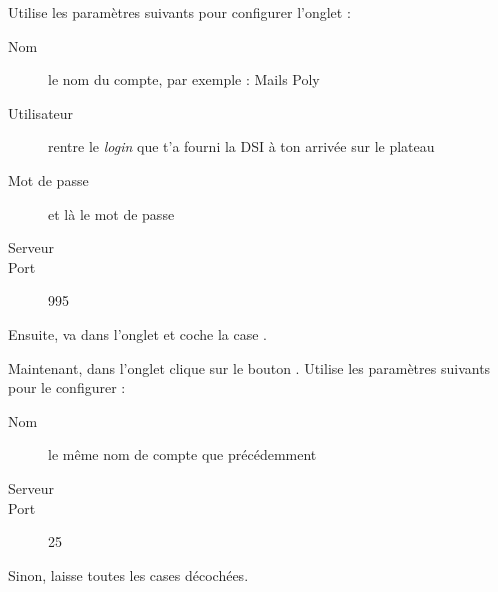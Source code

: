 Utilise les param\`etres suivants pour configurer l'onglet  :
\begin{description}
  \item[Nom] le nom du compte, par exemple : Mails Poly
  \item[Utilisateur] rentre le \emph{login}  que t'a fourni la DSI \`a  ton arriv\'ee sur le plateau
  \item[Mot de passe] et l\`a  le mot de passe 
  \item[Serveur] 
  \item[Port] 995
\end{description}
Ensuite, va dans l'onglet  et coche la case
.

Maintenant, dans l'onglet  clique sur le
bouton . Utilise les param\`etres suivants pour le
configurer :
\begin{description}
  \item[Nom] le m\^eme nom de compte que pr\'ec\'edemment
  \item[Serveur] 
  \item[Port] 25
\end{description}
Sinon, laisse toutes les cases d\'ecoch\'ees.

